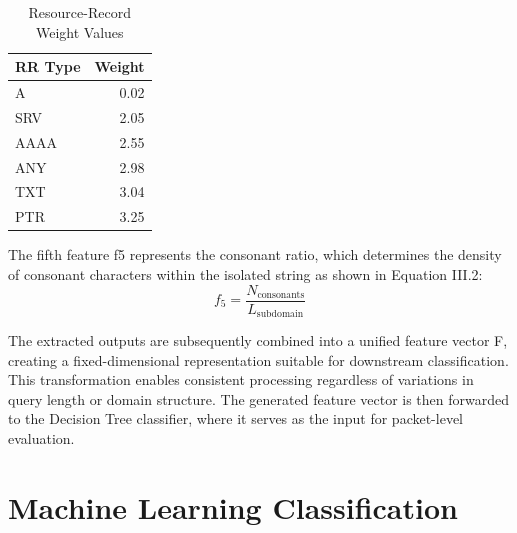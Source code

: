 \documentclass[14pt, a4paper, oneside]{report}
\begin{document}
\begin{table}[h]
\centering
\caption{Resource-Record Weight Values}
\vspace{0.1cm}
\label{tab:rr_type_weights}
\bgroup
\normalsize
\renewcommand{\arraystretch}{1.5} 
\begin{tabular}{|l|r|}
\hline
\textbf{RR Type} & \textbf{Weight} \\ \hline
A & 0.02 \\ \hline
SRV & 2.05 \\ \hline
AAAA & 2.55 \\ \hline
ANY & 2.98 \\ \hline
TXT & 3.04 \\ \hline
PTR & 3.25 \\ \hline
\end{tabular}
\egroup
\end{table}

The fifth feature f5 represents the consonant ratio, which determines the density of consonant characters within the isolated string as shown in Equation III.2:
\begin{equation}
f_5 = \frac{N_{\text{consonants}}}{L_{\text{subdomain}}}
\end{equation}

The extracted outputs are subsequently combined into a unified feature vector F, creating a fixed-dimensional representation suitable for downstream classification. This transformation enables consistent processing regardless of variations in query length or domain structure. The generated feature vector is then forwarded to the Decision Tree classifier, where it serves as the input for packet-level evaluation.

\section{Machine Learning Classification}
\label{sec:packet_classification}
\end{document}
